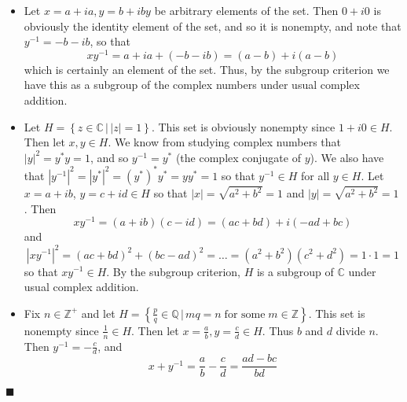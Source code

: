 \documentclass[12pt]{article}
\renewcommand{\qed}{\hfill$\blacksquare$}
\renewenvironment{proof}{\begin{addmargin}[1em]{0em}\begin{newproof}}{\end{newproof}\end{addmargin}\qed}
\begin{document}
\begin{proof}
\begin{itemize}
	\item Let $x=a+ia, y=b+iby $ be arbitrary elements of the set. Then $0+i0$ is obviously the identity element of the set, and so it is nonempty, and note that $y^{-1}=-b-ib$, so that $$xy^{-1}=a+ia + \left(-b-ib\right) = \left(a-b\right)+i\left(a-b\right) $$ which is certainly an element of the set. Thus, by the subgroup criterion we have this as a subgroup of the complex numbers under usual complex addition.\\
	\item Let $H=\left\{z \in \mathbb{C} \, | \, \left|z\right|=1\right\}$. This set is obviously nonempty since $1+i0\in H$. Then let $x,y\in H$. We know from studying complex numbers that $\left|y\right|^2 = y^*y = 1$, and so $y^{-1}=y^*$ (the complex conjugate of $y$). We also have that $\left|y^{-1}\right|^2=\left|y^*\right|^2 = \left(y^*\right)^* y^* = yy^* = 1$ so that $y^{-1} \in H$ for all $y\in H$. Let $x=a+ib$, $y=c+id \in H$ so that $\left|x\right|=\sqrt{a^2+b^2} = 1$ and $\left|y\right|=\sqrt{a^2+b^2}=1$. Then $$ xy^{-1}= \left(a+ib\right)\left(c-id\right) = \left(ac+bd\right)+i\left(-ad+bc\right)$$ and $$\left|xy^{-1}\right|^2 = \left(ac+bd\right)^2+\left(bc-ad\right)^2= \ldots = \left(a^2+b^2\right)\left(c^2+d^2\right) = 1\cdot 1 = 1 $$ so that $xy^{-1} \in H$. By the subgroup criterion, $H$ is a subgroup of $\mathbb{C}$ under usual complex addition.\\
	\item Fix $n\in \mathbb{Z}^+$ and let $H = \left\{ \frac{p}{q}\in \mathbb{Q} \, | \,  mq = n\; \text{for some} \; m\in \mathbb{Z} \right\} $. This set is nonempty since $\frac{1}{n} \in H$. Then let $x=\frac{a}{b}, y=\frac{c}{d} \in H$. Thus $b$ and $d$ divide $n$. Then $y^{-1}=-\frac{c}{d}$, and $$ x+y^{-1} = \frac{a}{b} -\frac{c}{d} = \frac{ad-bc}{bd} $$
\end{itemize}
\end{proof}
\end{document}
